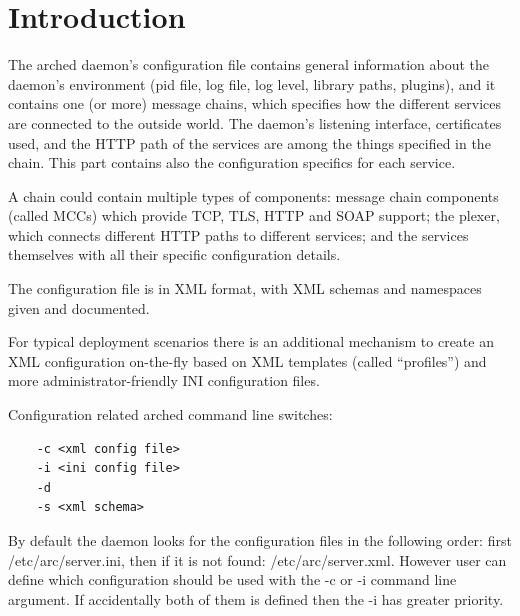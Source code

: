 \documentclass{article}
\renewcommand{\thefootnote}{\fnsymbol{footnote}}
\begin{document}
\tableofcontents                          %

\newpage

\renewcommand{\thefootnote}{\arabic{footnote}}



\section{Introduction} %

The arched daemon's configuration file contains general information about the daemon's environment (pid file, log file, log level, library paths, plugins), and it contains one (or more) message chains, which specifies how the different services are connected to the outside world. The daemon's listening interface, certificates used, and the HTTP path of the services are among the things specified in the chain. This part contains also the configuration specifics for each service.

A chain could contain multiple types of components: message chain components (called MCCs) which provide TCP, TLS, HTTP and SOAP support; the plexer, which connects different HTTP paths to different services; and the services themselves with all their specific configuration details.

The configuration file is in XML format, with XML schemas and namespaces given and documented.

For typical deployment scenarios there is an additional mechanism to create an XML configuration on-the-fly based on XML templates (called “profiles”) and more administrator-friendly INI configuration files.

Configuration related arched command line switches:

\begin{verbatim}
	-c <xml config file>
	-i <ini config file>
	-d
	-s <xml schema>
\end{verbatim}

By default the daemon looks for the configuration files in the following order: first /etc/arc/server.ini, then if it is not found: /etc/arc/server.xml. However user can define which configuration  should be used with the -c or -i command line argument. If accidentally both of them is defined then the -i has greater priority.
\end{document}
